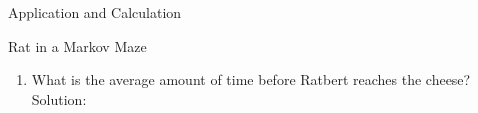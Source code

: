 \documentclass[12pt]{article}
\newcommand{\matindex}[1]{\mbox{\scriptsize#1}}
\newcommand\scalemath[2]{\scalebox{#1}{\mbox{\ensuremath{\displaystyle #2}}}}
\numberwithin{equation}{section}
\begin{document}
\begin{section}{Application and Calculation}
\begin{subsection}{Rat in a Markov Maze}
\begin{enumerate}
\item What is the average amount of time before Ratbert reaches the cheese?\\

Solution:\\

%

\end{enumerate}
\end{subsection}
\end{section}
\end{document}
